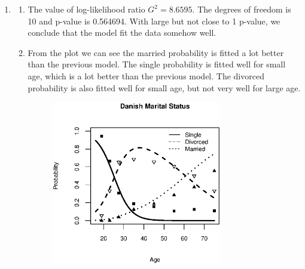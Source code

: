 \documentclass{article}
\begin{document}
\begin{enumerate}[leftmargin = 0 em, label = \arabic*., font = \bfseries]
\begin{enumerate}
\begin{enumerate}
		\end{enumerate}
\newpage
		\item 
		\begin{enumerate}
		
		\item The value of log-likelihood ratio $G^2 = 8.6595$. The degrees of freedom is 10 and p-value is 0.564694. With large but not close to 1 p-value, we conclude that the model fit the data somehow well.
		\item From the plot we can see the married probability is fitted a lot better than the previous model. The single probability is fitted well for small age, which is a lot better than the previous model. The divorced probability is also fitted well for small age, but not very well for large age. 
				\begin{figure}[!htb]
					\centering
					\includegraphics[width = 0.75\textwidth]{2B.eps}
				\end{figure}



\end{enumerate}
\end{enumerate}
\end{enumerate}
\end{document}
